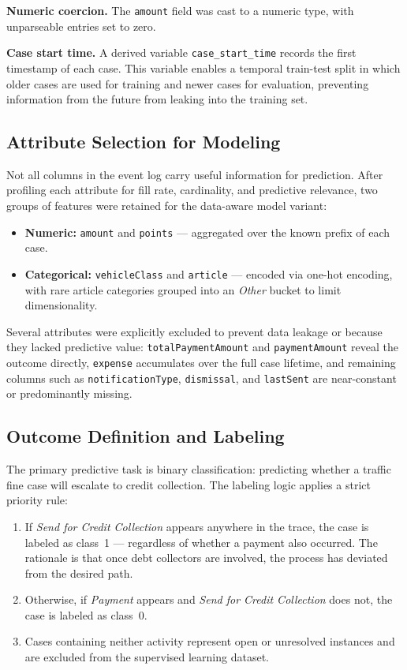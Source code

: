 \textbf{Numeric coercion.} The \texttt{amount} field was cast to a numeric type, with unparseable entries set to zero.

\textbf{Case start time.} A derived variable \texttt{case\_start\_time} records the first timestamp of each case. This variable enables a temporal train-test split in which older cases are used for training and newer cases for evaluation, preventing information from the future from leaking into the training set.

\subsection{Attribute Selection for Modeling}

Not all columns in the event log carry useful information for prediction. After profiling each attribute for fill rate, cardinality, and predictive relevance, two groups of features were retained for the data-aware model variant:

\begin{itemize}
    \item \textbf{Numeric:} \texttt{amount} and \texttt{points} — aggregated over the known prefix of each case.
    \item \textbf{Categorical:} \texttt{vehicleClass} and \texttt{article} — encoded via one-hot encoding, with rare article categories grouped into an \textit{Other} bucket to limit dimensionality.
\end{itemize}

Several attributes were explicitly excluded to prevent data leakage or because they lacked predictive value: \texttt{totalPaymentAmount} and \texttt{paymentAmount} reveal the outcome directly, \texttt{expense} accumulates over the full case lifetime, and remaining columns such as \texttt{notificationType}, \texttt{dismissal}, and \texttt{lastSent} are near-constant or predominantly missing.

\subsection{Outcome Definition and Labeling}

The primary predictive task is binary classification: predicting whether a traffic fine case will escalate to credit collection. The labeling logic applies a strict priority rule:

\begin{enumerate}
    \item If \textit{Send for Credit Collection} appears anywhere in the trace, the case is labeled as class~1 — regardless of whether a payment also occurred. The rationale is that once debt collectors are involved, the process has deviated from the desired path.
    \item Otherwise, if \textit{Payment} appears and \textit{Send for Credit Collection} does not, the case is labeled as class~0.
    \item Cases containing neither activity represent open or unresolved instances and are excluded from the supervised learning dataset.
\end{enumerate}

